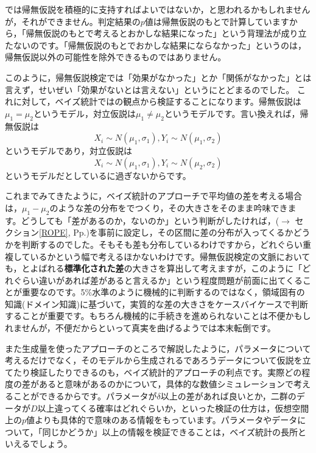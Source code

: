 \documentclass{ltjsbook}
\begin{document}
では帰無仮説を積極的に支持すればよいではないか，と思われるかもしれませんが，それができません。判定結果の$p$値は帰無仮説のもとで計算していますから，「帰無仮説のもとで考えるとおかしな結果になった」という背理法が成り立たないのです。「帰無仮説のもとでおかしな結果にならなかった」というのは，帰無仮説以外の可能性を除外できるものではありません。

このように，帰無仮説検定では「効果がなかった」とか「関係がなかった」とは言えず，せいぜい「効果がないとは言えない」というにとどまるのでした。
これに対して，ベイズ統計ではの観点から検証することになります。帰無仮説は$\mu_1=\mu_2$というモデル，対立仮説は$\mu_1 \neq \mu_2$というモデルです。言い換えれば，帰無仮説は
$$ X_i \sim N(\mu_1,\sigma_1), Y_i \sim N(\mu_1,\sigma_2)$$
というモデルであり，対立仮説は
$$ X_i \sim N(\mu_1,\sigma_1), Y_i \sim N(\mu_2,\sigma_2)$$
というモデルだとしているに過ぎないからです。

これまでみてきたように，ベイズ統計のアプローチで平均値の差を考える場合は，$\mu_1 - \mu_2$のような差の分布をでつくり，その大きさをそのまま吟味できます。どうしても「差があるのか，ないのか」という判断がしたければ，($\to $ セクション\ref{ROPE}, Pp.\pageref{ROPE})を事前に設定し，その区間に差の分布が入ってくるかどうかを判断するのでした。そもそも差も分布しているわけですから，どれぐらい重複しているかという幅で考えるほかないわけです。帰無仮説検定の文脈においても，とよばれる\textbf{標準化された差}の大きさを算出して考えますが，このように「どれぐらい違いがあれば差があると言えるか」という程度問題が前面に出てくることが重要なのです。5\%水準のように機械的に判断するのではなく，領域固有の知識(ドメイン知識)に基づいて，実質的な差の大きさをケースバイケースで判断することが重要です。もちろん機械的に手続きを進められないことは不便かもしれませんが，不便だからといって真実を曲げるようでは本末転倒です。

また生成量を使ったアプローチのところで解説したように，パラメータについて考えるだけでなく，そのモデルから生成されるであろうデータについて仮説を立てたり検証したりできるのも，ベイズ統計的アプローチの利点です。実際どの程度の差があると意味があるのかについて，具体的な数値シミュレーションで考えることができるからです。パラメータが$\delta$以上の差があれば良いとか，二群のデータが$D$以上違ってくる確率はどれぐらいか，といった検証の仕方は，仮想空間上の$p$値よりも具体的で意味のある情報をもっています。パラメータやデータについて，「同じかどうか」以上の情報を検証できることは，ベイズ統計の長所といえるでしょう。
\end{document}
